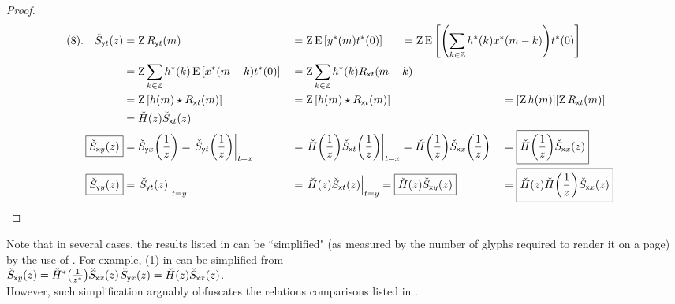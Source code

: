 \begin{proof}
\begin{align*}
    (8).\quad\Szyt(z)
      &\eqd \opZ\Ryt(m)
     &&\eqd \opZ\pE\brs{\rvy^\ast(m)\rvt^\ast(0)}
       \mathrlap{\qquad=    \opZ\pE\brs{\brp{\sum_{k\in\Z} \fh^\ast(k) \rvx^\ast(m-k)}\rvt^\ast(0)}}
    \\&=    \opZ\sum_{k\in\Z} \fh^\ast(k) \pE\brs{\rvx^\ast(m-k)\rvt^\ast(0)}
     &&\eqd \opZ\sum_{k\in\Z} \fh^\ast(k) \Rxt(m-k)
    \\&\eqd \opZ\brs{\fh(m) \convd \Rxt(m)}
     &&= \opZ\brs{\fh(m) \convd \Rxt(m)}
     &&= \brs{\opZ\fh(m)} \brs{\opZ\Rxt(m)}
    \\&= \ZH(z) \Szxt(z)
    \\
    \boxed{\Szxy(z)}
      &= \Szyx\brp{\frac{1}{z}}
       \eqd \brlr{\Szyt\brp{\frac{1}{z}}}_{\rvt=\rvx}
     &&= \brlr{\ZH\brp{\frac{1}{z}} \Szxt\brp{\frac{1}{z}}}_{\rvt=\rvx}
       = \ZH\brp{\frac{1}{z}} \Szxx\brp{\frac{1}{z}}
     &&= \boxed{\ZH\brp{\frac{1}{z}} \Szxx(z)}
    \\
    \boxed{\Szyy(z)}
      &\eqd \brlr{\Szyt(z)}_{\rvt=\rvy}
     &&= \brlr{\ZH(z) \Szxt(z)}_{\rvt=\rvy}
       = \boxed{\ZH(z) \Szxy(z)}
     &&= \boxed{\ZH(z) \ZH\brp{\frac{1}{z}} \Szxx(z)}
  \end{align*}
\end{proof}

\begin{remark}
Note that in several cases, the results listed in  can be ``simplified"
(as measured by the number of glyphs required to render it on a page)
by the use of . For example, (1) in  can be simplified from
\\\indentx$\check{S}_{{\mathsf xy}}(z)={{\check{{H}}}}^\ast{\left(\frac{1}{z^\ast}\right)}\check{S}_{{\mathsf xx}}(z)$\qquad$\check{S}_{{\mathsf yx}}(z) = {{\check{{H}}}}(z)\check{S}_{{\mathsf xx}}(z)$.
\\However, such simplification arguably obfuscates the relations comparisons listed in .
\end{remark}

